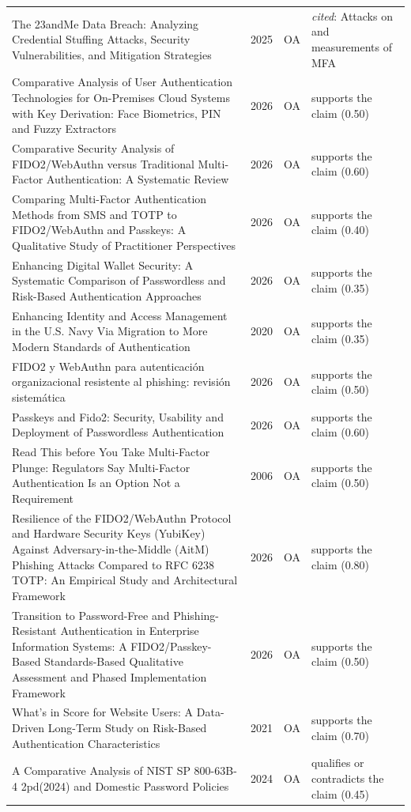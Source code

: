 \begin{longtable}{@{}%
  >{\raggedright\arraybackslash}p{}c%
  >{\raggedright\arraybackslash}p{}%
  >{\raggedright\arraybackslash}p{}@{}}
The 23andMe Data Breach: Analyzing Credential Stuffing Attacks, Security Vulnerabilities, and Mitigation Strategies & 2025 & OA & \emph{cited}: Attacks on and measurements of MFA \\
Comparative Analysis of User Authentication Technologies for On-Premises Cloud Systems with Key Derivation: Face Biometrics, PIN and Fuzzy Extractors & 2026 & OA & supports the claim (0.50) \\
Comparative Security Analysis of FIDO2/WebAuthn versus Traditional Multi-Factor Authentication: A Systematic Review & 2026 & OA & supports the claim (0.60) \\
Comparing Multi-Factor Authentication Methods from SMS and TOTP to FIDO2/WebAuthn and Passkeys: A Qualitative Study of Practitioner Perspectives & 2026 & OA & supports the claim (0.40) \\
Enhancing Digital Wallet Security: A Systematic Comparison of Passwordless and Risk-Based Authentication Approaches & 2026 & OA & supports the claim (0.35) \\
Enhancing Identity and Access Management in the U.S. Navy Via Migration to More Modern Standards of Authentication & 2020 & OA & supports the claim (0.35) \\
FIDO2 y WebAuthn para autenticación organizacional resistente al phishing: revisión sistemática & 2026 & OA & supports the claim (0.50) \\
Passkeys and Fido2: Security, Usability and Deployment of Passwordless Authentication & 2026 & OA & supports the claim (0.60) \\
Read This before You Take Multi-Factor Plunge: Regulators Say Multi-Factor Authentication Is an Option Not a Requirement & 2006 & OA & supports the claim (0.50) \\
Resilience of the FIDO2/WebAuthn Protocol and Hardware Security Keys (YubiKey) Against Adversary-in-the-Middle (AitM) Phishing Attacks Compared to RFC 6238 TOTP: An Empirical Study and Architectural Framework & 2026 & OA & supports the claim (0.80) \\
Transition to Password-Free and Phishing-Resistant Authentication in Enterprise Information Systems: A FIDO2/Passkey-Based Standards-Based Qualitative Assessment and Phased Implementation Framework & 2026 & OA & supports the claim (0.50) \\
What's in Score for Website Users: A Data-Driven Long-Term Study on Risk-Based Authentication Characteristics & 2021 & OA & supports the claim (0.70) \\
A Comparative Analysis of NIST SP 800-63B-4 2pd(2024) and Domestic Password Policies & 2024 & OA & qualifies or contradicts the claim (0.45) \\

\end{longtable}
